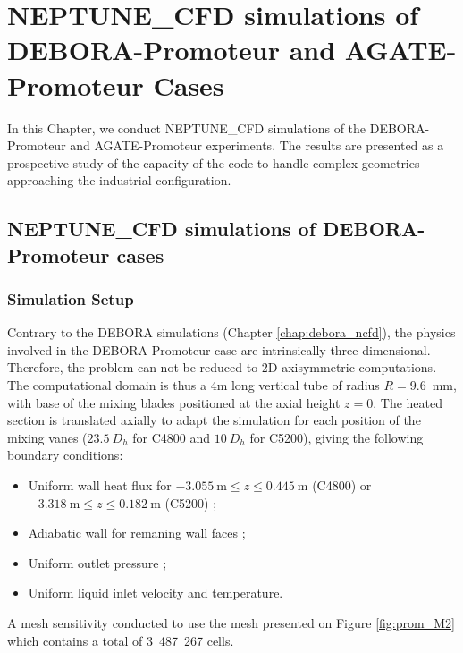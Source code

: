 \chapter{NEPTUNE\_CFD simulations of DEBORA-Promoteur and AGATE-Promoteur Cases}
\label{chap:prom_ncfd}

\minitoc


In this Chapter, we conduct NEPTUNE\_CFD simulations of the DEBORA-Promoteur and AGATE-Promoteur experiments. The results are presented as a prospective study of the capacity of the code to handle complex geometries approaching the industrial configuration.


\section{NEPTUNE\_CFD simulations of DEBORA-Promoteur cases}
\label{sec:debprom_ncfd}

\subsection{Simulation Setup}

Contrary to the DEBORA simulations (Chapter \ref{chap:debora_ncfd}), the physics involved in the DEBORA-Promoteur case are intrinsically three-dimensional. Therefore, the problem can not be reduced to 2D-axisymmetric computations. The computational domain is thus a 4m long vertical tube of radius $R=9.6$\ mm, with base of the mixing blades positioned at the axial height $z=0$. The heated section is translated axially to adapt the simulation for each position of the mixing vanes ($23.5\ D_{h}$ for C4800 and $10\ D_{h}$ for C5200), giving the following boundary conditions:

\begin{itemize}
\item Uniform wall heat flux for $-3.055\ \textrm{m} \leq z \leq 0.445\ \textrm{m}$ (C4800) or $-3.318\ \textrm{m} \leq z \leq 0.182\ \textrm{m}$ (C5200) ;
\item Adiabatic wall for remaning wall faces ;
\item Uniform outlet pressure ;
\item Uniform liquid inlet velocity and temperature.
\end{itemize}


A mesh sensitivity conducted to use the mesh presented on Figure \ref{fig:prom_M2} which contains a total of 3~487~267 cells.

